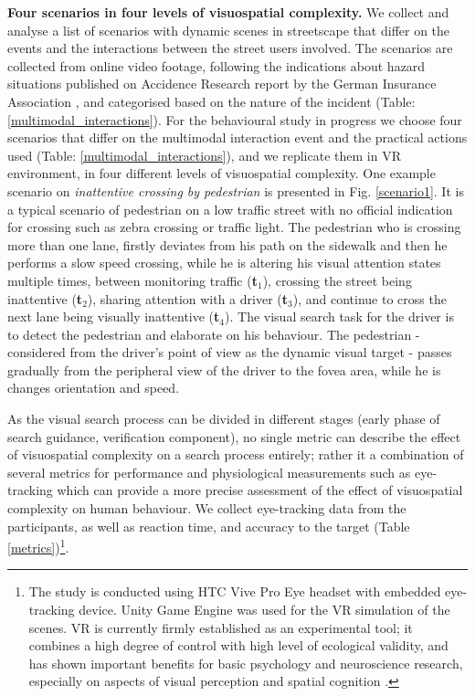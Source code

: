 \documentclass[a4paper]{article}
\newcommand{\timePoint}[1]{{\sffamily \footnotesize({\small \textbf{t}$_{#1}$}\footnotesize)}}
\begin{document}
 \textbf{\sffamily  Four scenarios in four levels of visuospatial complexity.} \quad We collect and analyse a list of scenarios with dynamic scenes in streetscape that differ on the events and the interactions between the street users involved. The scenarios are collected from online video footage, following the indications about hazard situations published on Accidence Research report by the German Insurance Association \cite{GDV2017}, and categorised based on the nature of the incident (Table: \ref{multimodal_interactions}).  For the behavioural study in progress we choose four scenarios that differ on the multimodal interaction event and the practical actions used (Table: \ref{multimodal_interactions}), and we replicate them in VR environment, in four different levels of visuospatial complexity. One example scenario on \emph{inattentive crossing by pedestrian} is presented in Fig. \ref{scenario1}.  It is a typical scenario of pedestrian on a low traffic street with no official indication for crossing such as zebra crossing or traffic light. The pedestrian who is crossing more than one lane, firstly deviates from his path on the sidewalk and then he performs a slow speed crossing, while he is altering his visual attention states multiple times, between monitoring traffic \timePoint{1}, crossing the street being inattentive \timePoint{2}, sharing attention with a driver \timePoint{3}, and continue to cross the next lane being visually inattentive \timePoint{4}. The visual search task for the driver is to detect the pedestrian and elaborate on his behaviour. The pedestrian - considered from the driver's point of view as the dynamic visual target - passes gradually from the peripheral view of the driver to the fovea area, while he is changes orientation and speed.  
\smallskip

As the visual search process can be divided in different stages (early phase of search guidance, verification component), no single metric can describe the effect of visuospatial complexity on a search process entirely; rather it a combination of several metrics for performance and physiological measurements such as eye-tracking which can provide a more precise assessment of the effect of visuospatial complexity on human behaviour.  We collect eye-tracking data from the participants, as well as reaction time, and accuracy to the target (Table \ref{metrics})\footnote{The study is conducted using HTC Vive Pro Eye headset with embedded eye-tracking device. Unity Game Engine was used for the VR simulation of the scenes. VR is currently firmly established as an experimental tool; it combines a high degree of control with high level of ecological validity, and has shown important benefits for basic psychology and neuroscience research, especially on aspects of visual perception and  spatial cognition \cite{Bohil2011,Olk2018,Scarfe2015,Wilson2015}. }.
\end{document}
